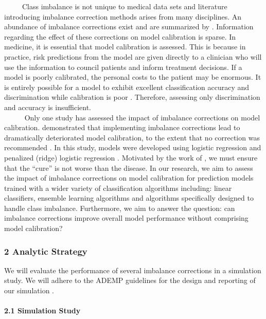\documentclass[
  12pt,
]{article}
\begin{document}
~~~~~Class imbalance is not unique to medical data sets and literature
introducing imbalance correction methods arises from many disciplines.
An abundance of imbalance corrections exist and are summarized by
\autocite{summary_b,summary_lp,summary_m,summary_h,summary_k}.
Information regarding the effect of these corrections on model
calibration is sparse. In medicine, it is essential that model
calibration is assessed. This is because in practice, risk predictions
from the model are given directly to a clinician who will use the
information to council patients and inform treatment decisions. If a
model is poorly calibrated, the personal costs to the patient may be
enormous. It is entirely possible for a model to exhibit excellent
classification accuracy and discrimination while calibration is poor
\autocite{achilles}. Therefore, assessing only discrimination and
accuracy is insufficient.\\

~~~~~ Only one study has assessed the impact of imbalance corrections on
model calibration. \textcite{ruben} demonstrated that implementing
imbalance corrections lead to dramatically deteriorated model
calibration, to the extent that no correction was recommended
\autocite{ruben}. In this study, models were developed using logistic
regression and penalized (ridge) logistic regression \autocite{ruben}.
Motivated by the work of \textcite{ruben}, we must ensure that the
``cure'' is not worse than the disease. In our research, we aim to
assess the impact of imbalance corrections on model calibration for
prediction models trained with a wider variety of classification
algorithms including: linear classifiers, ensemble learning algorithms
and algorithms specifically designed to handle class imbalance.
Furthermore, we aim to answer the question: can imbalance corrections
improve overall model performance without comprising model calibration?

\hypertarget{analytic-strategy}{%
\subsubsection{2\textbar{} Analytic Strategy}\label{analytic-strategy}}

We will evaluate the performance of several imbalance corrections in a
simulation study. We will adhere to the ADEMP guidelines for the design
and reporting of our simulation \autocite{tim_morris}.

\hypertarget{simulation-study}{%
\paragraph{\texorpdfstring{2.1\textbar{} Simulation Study\\
}{2.1\textbar{} Simulation Study }}\label{simulation-study}}
\end{document}
